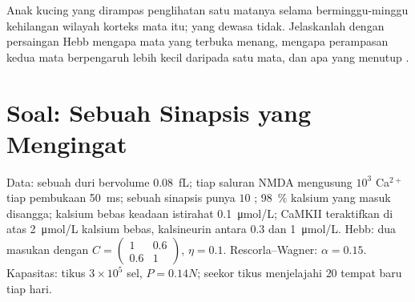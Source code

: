 \begin{exercise}[$\star\star\star$]\label{exo:b3:learning-memory:12}
Anak kucing yang dirampas penglihatan satu matanya selama berminggu-minggu kehilangan wilayah korteks
mata itu; yang dewasa tidak. Jelaskanlah dengan persaingan Hebb mengapa
mata yang terbuka menang, mengapa perampasan kedua mata berpengaruh lebih kecil daripada
satu mata, dan apa yang menutup .
\end{exercise}

\section{Soal: Sebuah Sinapsis yang Mengingat}

\begin{problem}
\label{pb:b3:learning-memory:1}
Data: sebuah duri bervolume \qty{0.08}{fL}; tiap saluran NMDA mengusung
$10^{3}$ Ca$^{2+}$ tiap pembukaan \qty{50}{ms}; sebuah sinapsis punya $10$ ; \qty{98}{\%} kalsium yang masuk disangga; kalsium bebas
keadaan istirahat \qty{0.1}{\micro mol/L}; CaMKII teraktifkan di atas
\qty{2}{\micro mol/L} kalsium bebas, kalsineurin antara $0.3$ dan
\qty{1}{\micro mol/L}. Hebb: dua masukan dengan $C = \begin{pmatrix}1 &
0.6\\ 0.6 & 1\end{pmatrix}$, $\eta = 0.1$. Rescorla--Wagner: $\alpha =
0.15$. Kapasitas:  tikus $3\times 10^{5}$ sel, $P = 0.14N$; seekor tikus
menjelajahi $20$ tempat baru tiap hari.


\end{problem}
